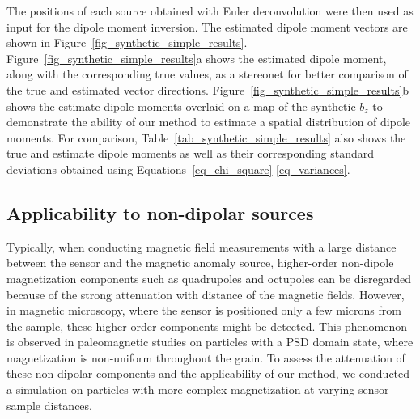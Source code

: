 The positions of each source obtained with Euler deconvolution were then used as input for the dipole moment inversion.
The estimated dipole moment vectors are shown in Figure~\ref{fig_synthetic_simple_results}.
Figure~\ref{fig_synthetic_simple_results}a shows the estimated dipole moment, along with the corresponding true values, as a stereonet for better comparison of the true and estimated vector directions.
Figure~\ref{fig_synthetic_simple_results}b shows the estimate dipole moments overlaid on a map of the synthetic $b_z$ to demonstrate the ability of our method to estimate a spatial distribution of dipole moments.
For comparison, Table~\ref{tab_synthetic_simple_results} also shows the true and estimate dipole moments as well as their corresponding standard deviations obtained using Equations~\ref{eq_chi_square}-\ref{eq_variances}.



\subsection{Applicability to non-dipolar sources}

Typically, when conducting magnetic field measurements with a large distance between the sensor and the magnetic anomaly source, higher-order non-dipole magnetization components such as quadrupoles and octupoles can be disregarded because of the strong attenuation with distance of the magnetic fields.
However, in magnetic microscopy, where the sensor is positioned only a few microns from the sample, these higher-order components might be detected.
This phenomenon is observed in paleomagnetic studies on particles with a PSD domain state, where magnetization is non-uniform throughout the grain.
To assess the attenuation of these non-dipolar components and the applicability of our method, we conducted a simulation on particles with more complex magnetization at varying sensor-sample distances.

